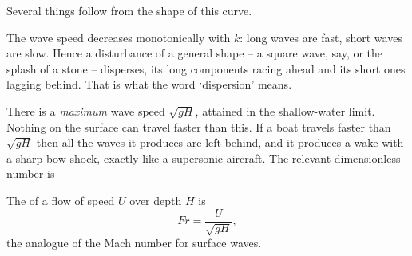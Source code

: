 \documentclass[a4paper]{scrartcl}
\newcommand{\Fr}{\mathit{Fr}}
\begin{document}
\begin{center}
\end{center}

Several things follow from the shape of this curve.

The wave speed decreases monotonically with $k$: long waves are fast, short waves are slow. Hence a disturbance of a general shape -- a square wave, say, or the splash of a stone -- disperses, its long components racing ahead and its short ones lagging behind. That is what the word `dispersion' means.

There is a \emph{maximum} wave speed $\sqrt{gH}$, attained in the shallow-water limit. Nothing on the surface can travel faster than this. If a boat travels faster than $\sqrt{gH}$ then all the waves it produces are left behind, and it produces a wake with a sharp bow shock, exactly like a supersonic aircraft. The relevant dimensionless number is

\begin{definition}
	The  of a flow of speed $U$ over depth $H$ is
	$$
	\Fr = \frac{U}{\sqrt{gH}},
	$$
	the analogue of the Mach number for surface waves.
\end{definition}
\end{document}
